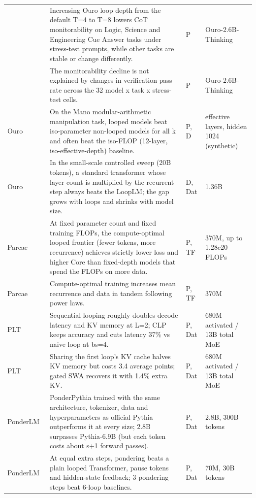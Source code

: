 \begin{longtable}{@{}>{\raggedright\arraybackslash}p{2.7cm}>{\raggedright\arraybackslash}p{7.9cm}>{\raggedright\arraybackslash}p{1.3cm}>{\raggedright\arraybackslash}p{2.5cm}@{}}
\citep{ax2610.02741} & Increasing Ouro loop depth from the default T=4 to T=8 lowers CoT monitorability on Logic, Science and Engineering Cue Answer tasks under stress-test prompts, while other tasks are stable or change differently. & P & Ouro-2.6B-Thinking \\
\citep{ax2610.02741} & The monitorability decline is not explained by changes in verification pass rate across the 32 model x task x stress-test cells. & P & Ouro-2.6B-Thinking \\
Ouro~\citep{ax2510.25741} & On the Mano modular-arithmetic manipulation task, looped models beat iso-parameter non-looped models for all k and often beat the iso-FLOP (12-layer, iso-effective-depth) baseline. & P, D & 12 effective layers, hidden 1024 (synthetic) \\
Ouro~\citep{ax2510.25741} & In the small-scale controlled sweep (20B tokens), a standard transformer whose layer count is multiplied by the recurrent step always beats the LoopLM; the gap grows with loops and shrinks with model size. & D, Dat & 1.36B \\
Parcae~\citep{ax2604.12946} & At fixed parameter count and fixed training FLOPs, the compute-optimal looped frontier (fewer tokens, more recurrence) achieves strictly lower loss and higher Core than fixed-depth models that spend the FLOPs on more data. & P, TF & 370M, up to 1.28e20 FLOPs \\
Parcae~\citep{ax2604.12946} & Compute-optimal training increases mean recurrence and data in tandem following power laws. & P, TF & 370M \\
PLT~\citep{ax2510.24824} & Sequential looping roughly doubles decode latency and KV memory at L=2; CLP keeps accuracy and cuts latency 37\% vs naive loop at bs=4. & P, Dat & 680M activated / 13B total MoE \\
PLT~\citep{ax2510.24824} & Sharing the first loop's KV cache halves KV memory but costs 3.4 average points; gated SWA recovers it with 1.4\% extra KV. & P, Dat & 680M activated / 13B total MoE \\
PonderLM~\citep{ax2505.20674} & PonderPythia trained with the same architecture, tokenizer, data and hyperparameters as official Pythia outperforms it at every size; 2.8B surpasses Pythia-6.9B (but each token costs about s+1 forward passes). & P, Dat & 2.8B, 300B tokens \\
PonderLM~\citep{ax2505.20674} & At equal extra steps, pondering beats a plain looped Transformer, pause tokens and hidden-state feedback; 3 pondering steps beat 6-loop baselines. & P, Dat & 70M, 30B tokens \\

\end{longtable}
